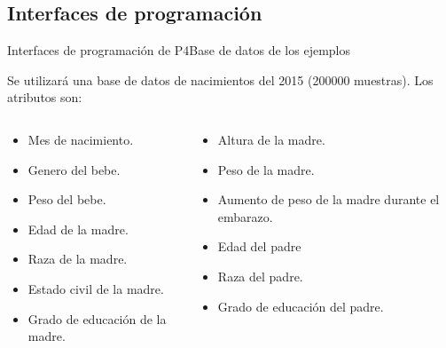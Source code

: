 \documentclass[10pt]{beamer}
\newcommand{\1}{
	\setbeamertemplate{background}{
		\texttt{[image: img/1]}
		\tikz[overlay] \fill[fill opacity=0.75,fill=white] (0,0) rectangle (-\paperwidth,\paperheight);
	}
}
\begin{document}
\subsection{Interfaces de programación}

\begin{frame}{Interfaces de programación de P4}{Base de datos de los ejemplos}
\begin{block}{}
	Se utilizará una base de datos de nacimientos del 2015 (200000 muestras). Los atributos son:
	
	\begin{columns}
		\begin{column}{0.48\textwidth}
			\begin{itemize}
				\item Mes de nacimiento.
				\item Genero del bebe.
				\item Peso del bebe.
				\item Edad de la madre.
				\item Raza de la madre.
				\item Estado civil de la madre.
				\item Grado de educación de la madre.
			\end{itemize}
		\end{column}
		\begin{column}{0.48\textwidth}
			\begin{itemize}
				\item Altura de la madre.
				\item Peso de la madre.
				\item Aumento de peso de la madre durante el embarazo.
				\item Edad del padre
				\item Raza del padre.
				\item Grado de educación del padre.
			\end{itemize}	
		\end{column}
	\end{columns}
	
	
\end{block}
\end{frame}
\end{document}
